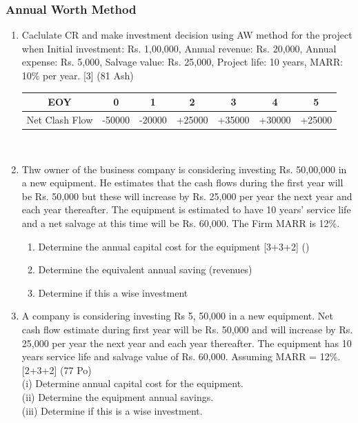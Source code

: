 \documentclass[12pt]{article}
\begin{document}
	\subsubsection{Annual Worth Method}
	\begin{enumerate}[noitemsep, topsep = 0pt]
		\item Caclulate CR and make investment decision using AW method for the project when Initial investment: Rs. 1,00,000, Annual revenue: Rs. 20,000, Annual expense: Rs. 5,000, Salvage value: Rs. 25,000, Project life: 10 years, MARR: 10\% per year. \hfill [3] (81 Ash)\\
		\begin{tabular}{|c|c|c|c|c|c|c|}
			\hline
			EOY & 0 & 1 & 2 & 3 & 4 & 5\\ \hline
			Net Clash Flow & -50000 & -20000 & +25000 & +35000 & +30000 & +25000\\ 
			\hline
		\end{tabular}\\[0pt]
		
		\item Thw owner of the business company is considering investing Rs. 50,00,000 in a new equipment. He estimates that the cash flows during the first year will be Rs. 50,000 but these will increase by Rs. 25,000 per year the next year and each year thereafter. The equipment is estimated to have 10 years' service life and a net salvage at this time will be Rs. 60,000. The Firm MARR is 12\%.
		\begin{enumerate}[noitemsep, topsep = 0pt, label = \alph*]
			\item Determine the annual capital cost for the equipment \hfill [3+3+2] ()
			\item Determine the equivalent annual saving (revenues)
			\item Determine if this a wise investment
		\end{enumerate}
		
		\item A company is considering investing Rs 5, 50,000 in a new equipment. Net cash flow estimate during first year will be Rs. 50,000 and will increase by Rs. 25,000 per year the next year and each year thereafter. The equipment has 10 years service life and salvage value of Rs. 60,000. Assuming MARR = 12\%.\hfill[2+3+2] (77 Po)\\
	(i) Determine annual capital cost for the equipment.\\
	(ii) Determine the equipment annual savings.\\
	(iii) Determine if this is a wise investment.
		

\end{enumerate}
\end{document}
